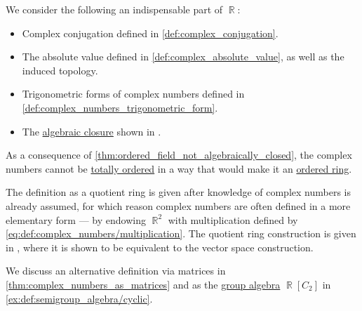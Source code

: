 \begin{comments}
  \item We consider the following an indispensable part of \( \BbbR \):
  \begin{itemize}
    \item Complex conjugation defined in \cref{def:complex_conjugation}.
    \item The absolute value defined in \cref{def:complex_absolute_value}, as well as the induced topology.
    \item Trigonometric forms of complex numbers defined in \cref{def:complex_numbers_trigonometric_form}.
    \item The \hyperref[def:algebraically_closed_field]{algebraic closure} shown in .
  \end{itemize}

  \item As a consequence of \cref{thm:ordered_field_not_algebraically_closed}, the complex numbers cannot be \hyperref[def:totally_ordered_set]{totally ordered} in a way that would make it an \hyperref[def:ordered_semiring]{ordered ring}.

  \item The definition as a quotient ring is given after knowledge of complex numbers is already assumed, for which reason complex numbers are often defined in a more elementary form --- by endowing \( \BbbR^2 \) with multiplication defined by \eqref{eq:def:complex_numbers/multiplication}. The quotient ring construction is given in \cite[example III.4.8]{Aluffi2009Algebra}, where it is shown to be equivalent to the vector space construction.

  We discuss an alternative definition via matrices in \cref{thm:complex_numbers_as_matrices} and as the \hyperref[def:semigroup_algebra]{group algebra} \( \BbbR[C_2] \) in \cref{ex:def:semigroup_algebra/cyclic}.
\end{comments}

